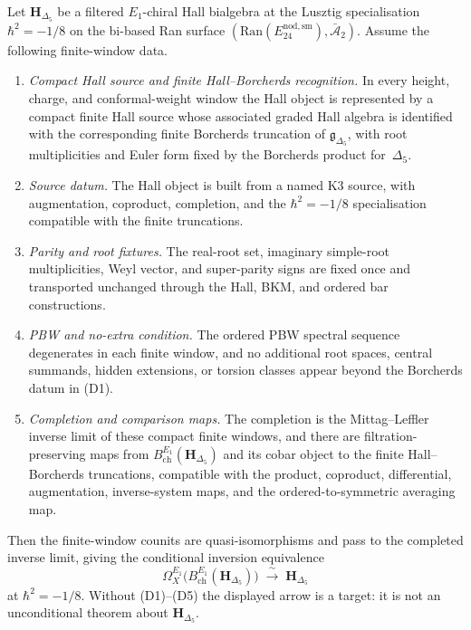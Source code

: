 \begin{theorem}
\label{thm:e1mkd-delta5-conditional-inversion}
Let $\mathbf H_{\Delta_5}$ be a filtered $E_1$-chiral Hall
bialgebra at the Lusztig specialisation $\hbar^2=-1/8$ on the
bi-based Ran surface
$(\mathrm{Ran}(E^{\mathrm{nod,sm}}_{24}),\bar{\mathcal A}_2)$.
Assume the following finite-window data.
\begin{enumerate}[label=\textup{(D\arabic*)}]
\item \emph{Compact Hall source and finite Hall--Borcherds
recognition.} In every height, charge, and conformal-weight window
the Hall object is represented by a compact finite Hall source whose
associated graded Hall algebra is identified with the corresponding
finite Borcherds truncation of $\mathfrak g_{\Delta_5}$, with root
multiplicities and Euler form fixed by the Borcherds product
for~$\Delta_5$.
\item \emph{Source datum.} The Hall object is built from a named
K3 source, with augmentation, coproduct, completion, and the
$\hbar^2=-1/8$ specialisation compatible with the finite truncations.
\item \emph{Parity and root fixtures.} The real-root set, imaginary
simple-root multiplicities, Weyl vector, and super-parity signs are
fixed once and transported unchanged through the Hall, BKM, and
ordered bar constructions.
\item \emph{PBW and no-extra condition.} The ordered PBW spectral
sequence degenerates in each finite window, and no additional root
spaces, central summands, hidden extensions, or torsion classes appear
beyond the Borcherds datum in \textup{(D1)}.
\item \emph{Completion and comparison maps.} The completion is the
Mittag--Leffler inverse limit of these compact finite windows, and
there are filtration-preserving maps from
$B^{E_1}_{\mathrm{ch}}(\mathbf H_{\Delta_5})$ and its cobar object to
the finite Hall--Borcherds truncations, compatible with the product,
coproduct, differential, augmentation, inverse-system maps, and the
ordered-to-symmetric averaging map.
\end{enumerate}
Then the finite-window counits are quasi-isomorphisms and pass to the
completed inverse limit, giving the conditional inversion equivalence
\[
\Omega^{E_1}_X\bigl(B^{E_1}_{\mathrm{ch}}(\mathbf H_{\Delta_5})\bigr)
\;\xrightarrow{\;\sim\;}\;
\mathbf H_{\Delta_5}
\]
at $\hbar^2=-1/8$. Without \textup{(D1)--(D5)} the displayed arrow is
a target: it is not an unconditional theorem about
$\mathbf H_{\Delta_5}$.
\end{theorem}

